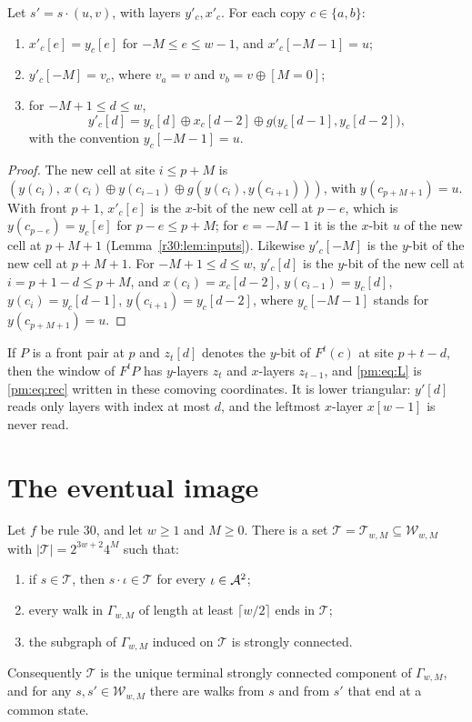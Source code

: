 \begin{lemma}\label{tc:lem:layer}
Let $s'=s\cdot(u,v)$, with layers $y'_c,x'_c$. For each copy $c\in\{a,b\}$:
\begin{enumerate}
\item $x'_c[e]=y_c[e]$ for $-M\le e\le w-1$, and $x'_c[-M-1]=u$;
\item $y'_c[-M]=v_c$, where $v_a=v$ and $v_b=v\oplus[M=0]$;
\item for $-M+1\le d\le w$,
\begin{equation}\label{pm:eq:L}
y'_c[d]=y_c[d]\oplus x_c[d-2]\oplus g\bigl(y_c[d-1],y_c[d-2]\bigr),
\end{equation}
with the convention $y_c[-M-1]=u$.
\end{enumerate}
\end{lemma}

\begin{proof}
The new cell at site $i\le p+M$ is $(y(c_i),\,x(c_i)\oplus y(c_{i-1})\oplus g(y(c_i),y(c_{i+1})))$, with $y(c_{p+M+1})=u$. With front $p+1$, $x'_c[e]$ is the $x$-bit of the new cell at $p-e$, which is $y(c_{p-e})=y_c[e]$ for $p-e\le p+M$; for $e=-M-1$ it is the $x$-bit $u$ of the new cell at $p+M+1$ (Lemma~\ref{r30:lem:inputs}). Likewise $y'_c[-M]$ is the $y$-bit of the new cell at $p+M+1$. For $-M+1\le d\le w$, $y'_c[d]$ is the $y$-bit of the new cell at $i=p+1-d\le p+M$, and $x(c_i)=x_c[d-2]$, $y(c_{i-1})=y_c[d]$, $y(c_i)=y_c[d-1]$, $y(c_{i+1})=y_c[d-2]$, where $y_c[-M-1]$ stands for $y(c_{p+M+1})=u$.
\end{proof}

If $P$ is a front pair at $p$ and $z_t[d]$ denotes the $y$-bit of $F^t(c)$ at site $p+t-d$, then the window of $F^tP$ has $y$-layers $z_t$ and $x$-layers $z_{t-1}$, and \eqref{pm:eq:L} is \eqref{pm:eq:rec} written in these comoving coordinates. It is lower triangular: $y'[d]$ reads only layers with index at most $d$, and the leftmost $x$-layer $x[w-1]$ is never read.

\section{The eventual image}\label{tc:sec:image}

\begin{theorem}\label{r30:thm:window}
Let $f$ be rule $30$, and let $w\ge1$ and $M\ge0$. There is a set $\mathcal{T}=\mathcal{T}_{w,M}\subseteq\mathcal{W}_{w,M}$ with $|\mathcal{T}|=2^{3w+2}4^M$ such that:
\begin{enumerate}
\item if $s\in\mathcal{T}$, then $s\cdot\iota\in\mathcal{T}$ for every $\iota\in\mathcal{A}^2$;
\item every walk in $\Gamma_{w,M}$ of length at least $\lceil w/2\rceil$ ends in $\mathcal{T}$;
\item the subgraph of $\Gamma_{w,M}$ induced on $\mathcal{T}$ is strongly connected.
\end{enumerate}
Consequently $\mathcal{T}$ is the unique terminal strongly connected component of $\Gamma_{w,M}$, and for any $s,s'\in\mathcal{W}_{w,M}$ there are walks from $s$ and from $s'$ that end at a common state.
\end{theorem}

